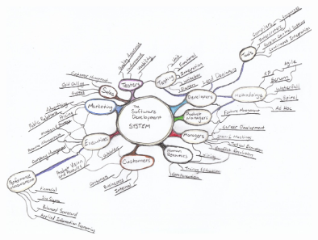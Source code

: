 \documentclass{beamer}
\begin{document}
\begin{frame}
\begin{overlayarea}{\textwidth}{\textheight}
{    \begin{center}
      \includegraphics[width=0.75\textwidth]{../img/software-development}
    \end{center}
  }
\end{overlayarea}
\end{frame}
\end{document}
